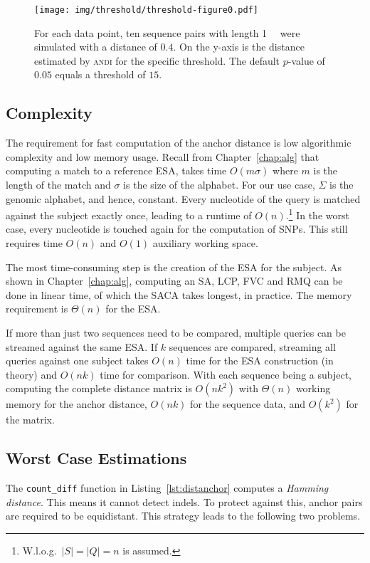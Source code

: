 \documentclass[a4paper,
  10pt,
  english,
  DIV=12,
  BCOR=8mm]{scrbook}
\newcommand{\algo}[1]{\textsc{{#1}}}
\newcommand{\andi}{\algo{andi} }
\begin{document}
\begin{figure}
  \centering
  \texttt{[image: img/threshold/threshold-figure0.pdf]}
  \caption[Threshold]{\label{fig:threshold} For each data point, ten sequence pairs with length \SI{1}{\mega\basepairs} were simulated with a distance of $0.4$. On the y-axis is the distance estimated by \andi for the specific threshold. The default $p$-value of $0.05$ equals a threshold of $15$. }
\end{figure}


\subsection{Complexity}

The requirement for fast computation of the anchor distance is low algorithmic complexity and low memory usage. Recall from Chapter~\ref{chap:alg} that computing a match to a reference \ac{ESA}, takes time $O(m \sigma)$ where $m$ is the length of the match and $\sigma$ is the size of the alphabet. For our use case, $\Sigma$ is the genomic alphabet, and hence, constant. Every nucleotide of the query is matched against the subject exactly once, leading to a runtime of $O(n)$.\footnote{W.l.o.g.\ $|S| = |Q| = n $ is assumed.} In the worst case, every nucleotide is touched again for the computation of \acp{SNP}. This still requires time $O(n)$ and $O(1)$ auxiliary working space.

The most time-consuming step is the creation of the \ac{ESA} for the subject. As shown in Chapter~\ref{chap:alg}, computing an \ac{SA}, \ac{LCP}, \ac{FVC} and \ac{RMQ} can be done in linear time, of which the \ac{SACA} takes longest, in practice. The memory requirement is $\Theta(n)$ for the \ac{ESA}.

If more than just two sequences need to be compared, multiple queries can be streamed against the same \ac{ESA}. If $k$ sequences are compared, streaming all queries against one subject takes $O(n)$ time for the \ac{ESA} construction (in theory) and $O(nk)$ time for comparison. With each sequence being a subject, computing the complete distance matrix is $O(nk^2)$ with $\Theta(n)$ working memory for the anchor distance, $O(nk)$ for the sequence data, and $O(k^2)$ for the matrix.


\subsection{Worst Case Estimations}\label{sec:worst}

The \lstinline$count_diff$ function in Listing~\ref{lst:distanchor} computes a \emph{Hamming distance}. This means it cannot detect indels. To protect against this, anchor pairs are required to be equidistant. This strategy leads to the following two problems.
\end{document}
